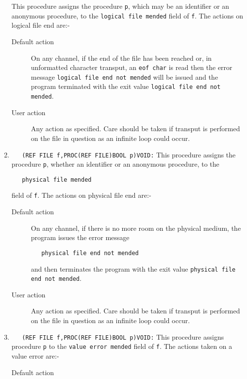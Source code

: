 \begin{enumerate}
This procedure assigns the procedure \verb|p|, which may be an
identifier or an anonymous procedure, to the \texttt{logical file
mended} field of \verb|f|. The actions on logical file end are:-
\begin{description}
\item[Default action]
On any channel, if the end of the file has been reached or, in
unformatted character transput, an \verb|eof char| is read then the
error message \texttt{logical file end not mended} will be issued and
the program terminated with the exit value \texttt{logical file end
not mended}.
\item[User action]
Any action as specified. Care should be taken if transput is performed
on the file in question as an infinite loop could occur.
\end{description}
\item {}\newline
\verb|   (REF FILE f,PROC(REF FILE)BOOL p)VOID:|\newline
This procedure assigns the procedure \verb|p|, whether an identifier or
an anonymous procedure, to the
\begin{verbatim}
   physical file mended
\end{verbatim}
\noindent
field of \verb|f|. The actions on physical file end are:-
\begin{description}
\item[Default action]
On any channel, if there is no more room on the physical medium, the
program issues the error message
\begin{verbatim}
   physical file end not mended
\end{verbatim}
\noindent
and then terminates the program with the exit value \texttt{physical
file end not mended}.
\item[User action]
Any action as specified. Care should be taken if transput is performed
on the file in question as an infinite loop could occur.
\end{description}
\item {}\newline
\verb|   (REF FILE f,PROC(REF FILE)BOOL p)VOID:|\newline
This procedure assigns procedure \verb|p| to the \texttt{value error
mended} field of \verb|f|. The actions taken on a value error are:-
\begin{description}
\item[Default action]

\end{description}
\end{enumerate}
